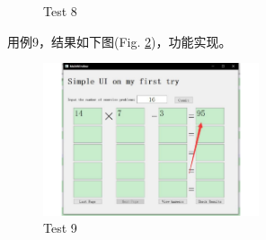 \documentclass[10pt,journal,compsoc,fleqn]{IEEEtran}
\begin{document}
\begin{CJK}{UTF8}{song}
\begin{figure}[H]
  \caption{Test 8}
  \label{Test_8}
\end{figure}
用例9，结果如下图(Fig. \ref{Test_9})，功能实现。
\begin{figure}[H]
  \centering
  \includegraphics[width=2.5in]{./figures/9.pdf}
  \caption{Test 9}
  \label{Test_9}
\end{figure}

\end{CJK}
\end{document}

